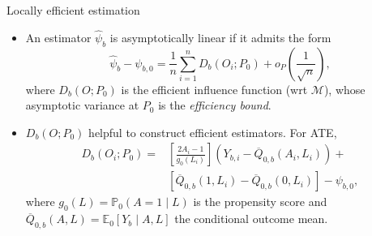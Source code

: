 \documentclass{beamer}
\begin{document}
\begin{frame}[c]{Locally efficient estimation}

\begin{center}
\begin{itemize}
  \itemsep6pt
  \item An estimator $\hat{\psi}_b$ is asymptotically linear if it admits the
    form
    $$ \hat{\psi}_b - \psi_{b,0} = \frac{1}{n} \sum_{i = 1}^{n}
      D_b(O_i; P_0) + o_P\left(\frac{1}{\sqrt{n}}\right), $$
      where $D_b(O; P_0)$ is the efficient influence function (wrt
      $\mathcal{M}$), whose asymptotic variance at $P_0$ is the
      \textit{efficiency bound}.
  \item $D_b(O; P_0)$ helpful to construct efficient estimators. For ATE,
    \begin{align*}
      D_b (O_i; P_0) =& \left[\frac{2A_i - 1}{g_0(L_i)} \right] (Y_{b, i} -
      \overline{Q}_{0,b}(A_i, L_i)) + \\ &[\overline{Q}_{0,b}(1, L_i)
      - \overline{Q}_{0,b}(0, L_i)] - \psi_{b, 0},
    \end{align*}
    where $g_0(L) = \mathbb{P}_0(A = 1 \mid L)$ is the propensity score
    and $\overline{Q}_{0,b}(A,L) = \mathbb{E}_0[Y_b \mid A, L]$ the conditional
    outcome mean.
\end{itemize}
\end{center}

\end{frame}

\end{document}
